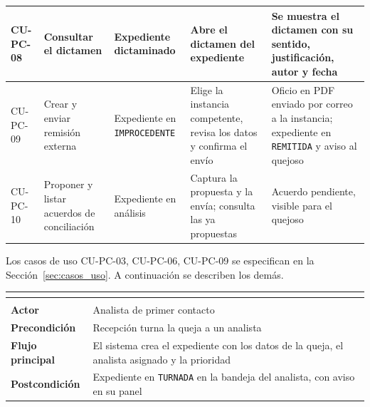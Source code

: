 \begin{longtable}{|L{1.6cm}|L{3.0cm}|L{2.9cm}|L{4.2cm}|L{3.5cm}|}
	CU-PC-08 & Consultar el dictamen & Expediente dictaminado & Abre el dictamen del expediente & Se muestra el dictamen con su sentido, justificación, autor y fecha \\ \hline
	CU-PC-09 & Crear y enviar remisión externa & Expediente en \texttt{IMPROCEDENTE} & Elige la instancia competente, revisa los datos y confirma el envío & Oficio en PDF enviado por correo a la instancia; expediente en \texttt{REMITIDA} y aviso al quejoso \\ \hline
	CU-PC-10 & Proponer y listar acuerdos de conciliación & Expediente en análisis & Captura la propuesta y la envía; consulta las ya propuestas & Acuerdo pendiente, visible para el quejoso \\ \hline
\end{longtable}
\normalsize
\setlength{\tabcolsep}{6pt}
\renewcommand{\arraystretch}{1}

Los casos de uso CU-PC-03, CU-PC-06, CU-PC-09 se especifican en la Sección~\ref{sec:casos_uso}. A continuación se describen los demás.

\begingroup
{}
\small
\renewcommand{\arraystretch}{1.25}
\setlength{\tabcolsep}{4pt}
\begin{longtable}{|L{3.2cm}|L{12.4cm}|}
	\hline
	 \\
	\hline
	\endfirsthead
	\hline
	 \\
	\hline
	\endhead
	\textbf{Actor} & Analista de primer contacto \\ \hline
	\textbf{Precondición} & Recepción turna la queja a un analista \\ \hline
	\textbf{Flujo principal} & El sistema crea el expediente con los datos de la queja, el analista asignado y la prioridad \\ \hline
	\textbf{Postcondición} & Expediente en \texttt{TURNADA} en la bandeja del analista, con aviso en su panel \\ \hline
\end{longtable}
\endgroup

